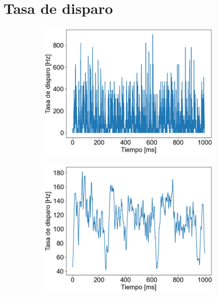 \documentclass[aps,prb,twocolumn,superscriptaddress,floatfix,longbibliography]{revtex4-2}
\begin{document}
\section{Tasa de disparo}

\begin{figure}
  \centering
  \begin{subfigure}[b]{0.3\textwidth}
      \centering
      \includegraphics[width=\textwidth]{tasa_de_disparo_2.png}
      \caption{\label{fig:tasa_de_disparo_2}}
  \end{subfigure}
  \hfill
  \begin{subfigure}[b]{0.3\textwidth}
      \centering
      \includegraphics[width=\textwidth]{tasa_de_disparo_300.png}
      \caption{\label{fig:tasa_de_disparo_300}}

\end{subfigure}
\end{figure}
\end{document}
